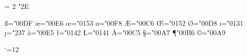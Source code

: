 \protected{} %
\protected\def\}{\ifmmode\rbrace\else\char`\}\fi} %
\let\neq=\ne
\let\le=\leq
\let\ge=\geq
\let\owns=\ni
\let\gets=\leftarrow
\let\to=\rightarrow
\let\hbar=\hslash
\def\cdots{\mathinner{\cdotp\mkern-1mu\cdotp\mkern-1mu\cdotp}}
\Umathchardef \ldotp = 2 \unimathfam "2E
\def\ldots{\mathinner{\ldotp\mkern-1mu\ldotp\mkern-1mu\ldotp}}

\protected\def\leavevmode@ifvmode{\ifvmode\expandafter\indent\fi}
\protected\def\,{\ifmmode\mskip\thinmuskip\else
  \leavevmode@ifvmode\kern.16667em\fi\relax}
\protected\def\>{\ifmmode\mskip\medmuskip\else
  \leavevmode@ifvmode\kern.2222em\fi\relax}
\protected\def\;{\ifmmode\mskip\thickmuskip\else
  \leavevmode@ifvmode\kern.2777em\fi\relax}
\protected\def\!{\ifmmode\mskip-\thinmuskip\else
  \leavevmode@ifvmode\kern-.16667em\fi\relax}
\def\*{\discretionary{\thinspace\hbox{$\times$}}{}{}}

\chardef\ss="00DF
\chardef\ae="00E6
\chardef\oe="0153
\chardef\o="00F8
\chardef\AE="00C6
\chardef\OE="0152
\chardef\O="00D8
\chardef\i="0131 \chardef\j="237 %
\chardef\aa="00E5
\chardef\l="0142
\chardef\L="0141
\chardef\AA="00C5
\protected\def\dag{\ifmmode\mathord{\dagger}\else\char"2020\fi}
\protected\def\ddag{\ifmmode\mathord{\ddagger}\else\char"2021\fi}
\chardef\S="00A7
\chardef\P"00B6
\chardef\copyright="00A9

\catcode`\@=12
\tenrm
\endinput
